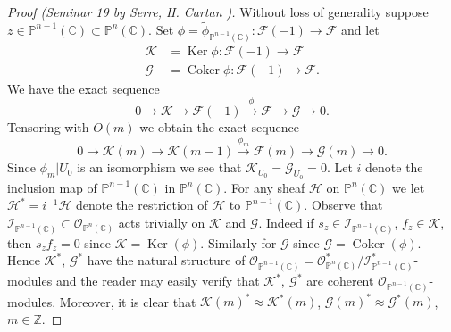 \begin{proof}[Proof (Seminar 19 by Serre, H. Cartan \cite{bib:II:cartan-h:2})]
Without loss of generality suppose $z\in\mathbb{P}^{n-1}(\mathbb{C})\subset\mathbb{P}^n(\mathbb{C})$. Set $\phi=\widetilde\phi_{\mathbb{P}^{n-1}(\mathbb{C})}:\mathcal{F}(-1)\to\mathcal{F}$ and let
\[
\begin{aligned}
\mathcal{K}&=\operatorname{Ker}\phi:\mathcal{F}(-1)\to\mathcal{F}\\
\mathcal{G}&=\operatorname{Coker}\phi:\mathcal{F}(-1)\to\mathcal{F}.
\end{aligned}
\]
We have the exact sequence
\[
0\to\mathcal{K}\to\mathcal{F}(-1)\xrightarrow{\phi}\mathcal{F}\to\mathcal{G}\to0.
\]
Tensoring with $O(m)$ we obtain the exact sequence
\[
0\to\mathcal{K}(m)\to\mathcal{K}(m-1)\xrightarrow{\phi_m}\mathcal{F}(m)\to\mathcal{G}(m)\to0.
\]
Since $\phi_m|U_0$ is an isomorphism we see that $\mathcal{K}_{U_0}=\mathcal{G}_{U_0}=0$. Let $i$ denote the inclusion map of $\mathbb{P}^{n-1}(\mathbb{C})$ in $\mathbb{P}^n(\mathbb{C})$. For any sheaf $\mathcal{H}$ on $\mathbb{P}^n(\mathbb{C})$ we let $\mathcal{H}^*=i^{-1}\mathcal{H}$ denote the restriction of $\mathcal{H}$ to $\mathbb{P}^{n-1}(\mathbb{C})$. Observe that $\mathcal{I}_{\mathbb{P}^{n-1}(\mathbb{C})}\subset\mathcal{O}_{\mathbb{P}^n(\mathbb{C})}$ acts trivially on $\mathcal{K}$ and $\mathcal{G}$. Indeed if $s_z\in\mathcal{I}_{\mathbb{P}^{n-1}(\mathbb{C})}$, $f_z\in\mathcal{K}$, then $s_zf_z=0$ since $\mathcal{K}=\operatorname{Ker}(\phi)$. Similarly for $\mathcal{G}$ since $\mathcal{G}=\operatorname{Coker}(\phi)$. Hence $\mathcal{K}^*$, $\mathcal{G}^*$ have the natural structure of $\mathcal{O}_{\mathbb{P}^{n-1}(\mathbb{C})}=\mathcal{O}_{\mathbb{P}^n(\mathbb{C})}^*/\mathcal{I}_{\mathbb{P}^{n-1}(\mathbb{C})}^*$-modules and the reader may easily verify that $\mathcal{K}^*$, $\mathcal{G}^*$ are coherent $\mathcal{O}_{\mathbb{P}^{n-1}(\mathbb{C})}$-modules. Moreover, it is clear that $\mathcal{K}(m)^*\approx\mathcal{K}^*(m)$, $\mathcal{G}(m)^*\approx\mathcal{G}^*(m)$, $m\in\mathbb{Z}$.


\end{proof}
